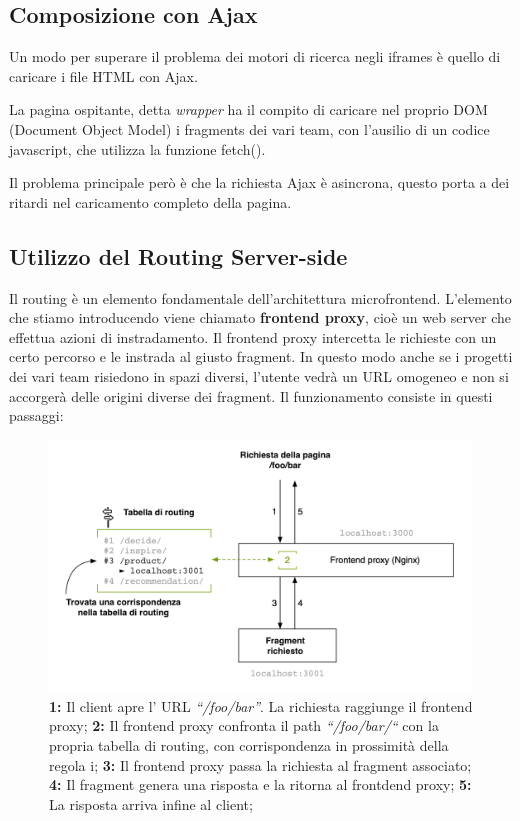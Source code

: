 \subsection{Composizione con Ajax}
Un modo per superare il problema dei motori di ricerca negli iframes è quello di 
caricare i file HTML con Ajax.

La pagina ospitante, detta \emph{wrapper} ha il compito di caricare nel proprio DOM (Document Object Model) i fragments dei vari 
team, con l'ausilio di un codice javascript, che utilizza la funzione fetch().

Il problema principale però è che la richiesta Ajax è asincrona, 
questo porta a dei ritardi nel caricamento completo della pagina.

\subsection{Utilizzo del Routing Server-side}
Il routing è un elemento fondamentale dell’architettura microfrontend.
L’elemento che stiamo introducendo viene chiamato \textbf{frontend proxy}, cioè un web server che effettua azioni di instradamento.
 Il frontend proxy intercetta le richieste con un certo percorso e le instrada al giusto fragment. In questo modo anche se
  i progetti dei vari team risiedono in spazi diversi, l’utente vedrà un URL omogeneo e non si accorgerà delle origini diverse dei fragment.
Il funzionamento consiste in questi passaggi:

\begin{figure}[H]
    \centering
    \includegraphics[width=140mm]{img/frontend proxy}
    \caption{  
        \textbf{1:} Il client apre l’ URL \emph{“/foo/bar”}. La richiesta raggiunge il frontend proxy;
        \textbf{2:} Il frontend proxy confronta il path \emph{“/foo/bar/“} con la propria tabella di routing, con corrispondenza in prossimità della regola i;
        \textbf{3:} Il frontend proxy passa la richiesta al fragment associato;
        \textbf{4:} Il fragment genera una risposta e la ritorna al frontdend proxy;
        \textbf{5:} La risposta arriva infine al client;
   }
  \end{figure}


